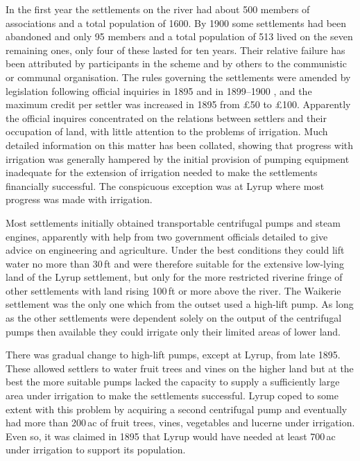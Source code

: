 In the first year the settlements on the river had about 500 members
of associations and a total population of 1600.  By
1900 some settlements had been abandoned and only 95 members and a
total population of 513 lived on the seven remaining ones, only four
of these lasted for ten years.  Their relative failure has been
attributed by participants in the scheme and by others to the
communistic or communal organisation.  The rules governing the
settlements were amended by legislation following official inquiries
in 1895 and in 1899--1900 , and the maximum credit per settler was
increased in 1895 from \pounds50 to \pounds100.  Apparently the official inquires
concentrated on the relations between settlers and their occupation of
land, with little attention to the problems of irrigation.  Much
detailed information on this matter has been collated, showing that
progress with irrigation was generally hampered by the initial
provision of pumping equipment inadequate for the extension of
irrigation needed to make the settlements financially
successful.  The conspicuous
exception was at Lyrup where most progress was made with irrigation.

Most settlements initially obtained transportable centrifugal pumps
and steam engines, apparently with help from two government officials
detailed to give advice on engineering and agriculture.  Under the
best conditions they could lift water no more than 30\,ft and were
therefore suitable for the extensive low-lying land of the Lyrup
settlement, but only for the more restricted riverine fringe of other
settlements with land rising 100\,ft or more above the river.  The
Waikerie settlement was the only one which from the outset used a
high-lift pump.  As long as the other settlements were dependent
solely on the output of the centrifugal pumps then available they
could irrigate only their limited areas of lower land.

There was gradual change to high-lift pumps, except at Lyrup, from
late 1895.  These allowed settlers to water fruit trees and vines on
the higher land but at the best the more suitable pumps lacked the
capacity to supply a sufficiently large area under irrigation to make
the settlements successful.  Lyrup coped to some extent with this
problem by acquiring a second centrifugal pump and eventually had more
than 200\,ac of fruit trees, vines, vegetables and lucerne under
irrigation.  Even so, it was claimed in 1895 that
Lyrup would have needed at least 700\,ac under irrigation to support
its population.

